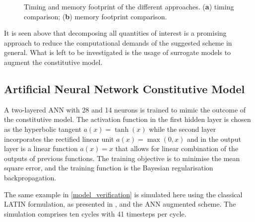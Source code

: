 \begin{figure}[hbt!]
	\centering
	\begin{subfigure}[t]{0.49\linewidth}
		
		\caption{}
		\label{fig_local_pgd_time_fine1}
	\end{subfigure}
	\hfil
	\begin{subfigure}[t]{0.49\linewidth}
		
		\caption{}
		\label{fig_local_pgd_time_fine2}
	\end{subfigure}
	\caption{Timing and memory footprint of the different approaches. (\textbf{a}) timing comparison; (\textbf{b}) memory footprint comparison.}
	\label{fig_local_pgd_time_fine}
\end{figure}

It is seen above that decomposing all quantities of interest is a promising approach to reduce the computational demands of the suggested scheme in general. What is left to be investigated is the usage of surrogate models to augment the constitutive model.

\subsection{Artificial Neural Network Constitutive Model}
A two-layered ANN with 28 and 14 neurons is trained to mimic the outcome of the constitutive model. The activation function in the first hidden layer is chosen as the hyperbolic tangent $a(x) = \tanh(x)$ while the second layer incorporates the rectified linear unit $a(x) = \max(0,x)$ and in the output layer is a linear function $a(x)=x$ that allows for linear combination of the outputs of previous functions. The training objective is to minimise the mean square error, and the training function is the Bayesian regularisation backpropagation.

The same example in \cref{model_verification} is simulated here using the classical LATIN formulation, as presented in , and the ANN augmented scheme. The simulation comprises ten cycles with 41 timesteps per cycle.

